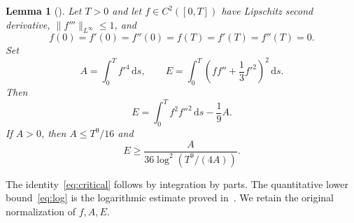 \documentclass[11pt,a4paper]{article}
\newtheorem{lemma}[theorem]{Lemma}
\newcommand{\dd}{\,\mathrm{d}}
\begin{document}
\begin{lemma}[{\cite[Lemma~2]{Jin}}]\label{lem:log}
Let $T>0$ and let $f\in C^2([0,T])$ have Lipschitz second derivative,
$\|f'''\|_{L^\infty}\le1$, and
\[
 f(0)=f'(0)=f''(0)=f(T)=f'(T)=f''(T)=0.
\]
Set
\[
 A=\int_0^T f'^4\dd s,\qquad
 E=\int_0^T\left(ff''+\frac13f'^2\right)^2\dd s.
\]
Then
\begin{equation}\label{eq:critical}
 E=\int_0^T f^2f''^2\dd s-\frac19A.
\end{equation}
If $A>0$, then $A\le T^9/16$ and
\begin{equation}\label{eq:log}
 E\ge\frac{A}{36\log^2(T^9/(4A))}.
\end{equation}
\end{lemma}

The identity~\eqref{eq:critical} follows by integration by parts.
The quantitative lower bound~\eqref{eq:log} is the logarithmic estimate
proved in~\cite{Jin}. We retain the original normalization of $f,A,E$.
\end{document}
